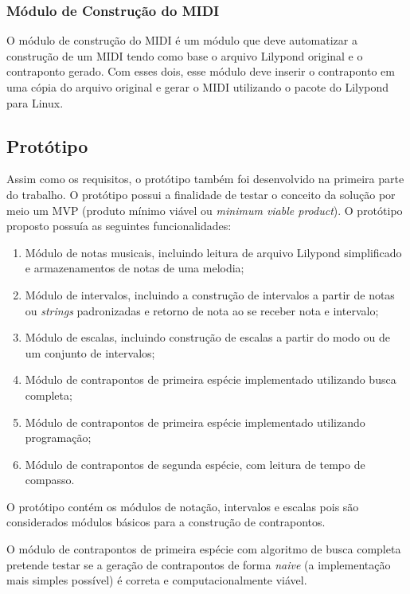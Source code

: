     \subsubsection[Módulo de Construção do MIDI]{Módulo de Construção do MIDI}

      O módulo de construção do MIDI é um módulo que deve automatizar a construção de um MIDI tendo como base o arquivo Lilypond original e o contraponto gerado. Com esses dois, esse módulo deve inserir o contraponto em uma cópia do arquivo original e gerar o MIDI utilizando o pacote do Lilypond para Linux.

  \subsection[Protótipo]{Protótipo}

    Assim como os requisitos, o protótipo também foi desenvolvido na primeira parte do trabalho. O protótipo possui a finalidade de testar o conceito da solução por meio um MVP (produto mínimo viável ou \textit{minimum viable product}). O protótipo proposto possuía as seguintes funcionalidades:

    \begin{enumerate}
      \item Módulo de notas musicais, incluindo leitura de arquivo Lilypond simplificado e armazenamentos de notas de uma melodia;
      \item Módulo de intervalos, incluindo a construção de intervalos a partir de notas ou \textit{strings} padronizadas e retorno de nota ao se receber nota e intervalo;
      \item Módulo de escalas, incluindo construção de escalas a partir do modo ou de um conjunto de intervalos;
      \item Módulo de contrapontos de primeira espécie implementado utilizando busca completa;
      \item Módulo de contrapontos de primeira espécie implementado utilizando programação;
      \item Módulo de contrapontos de segunda espécie, com leitura de tempo de compasso.
    \end{enumerate}

    O protótipo contém os módulos de notação, intervalos e escalas pois são considerados módulos básicos para a construção de contrapontos.

    O módulo de contrapontos de primeira espécie com algoritmo de busca completa pretende testar se a geração de contrapontos de forma \textit{naive} (a implementação mais simples possível) é correta e computacionalmente viável.

